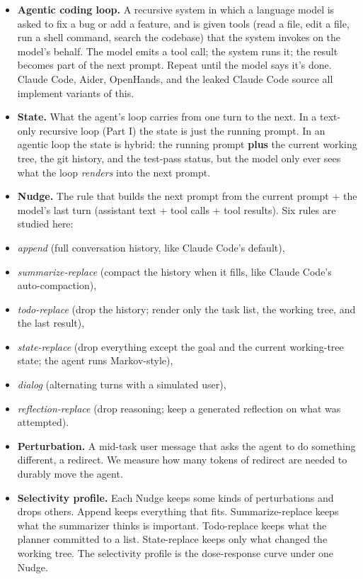 \documentclass{article}
\theoremstyle{plain}
\theoremstyle{definition}
\begin{document}
\begin{itemize}
  \item \textbf{Agentic coding loop.} A recursive system in which a language model is asked to fix a bug or add a feature, and is given tools (read a file, edit a file, run a shell command, search the codebase) that the system invokes on the model's behalf. The model emits a tool call; the system runs it; the result becomes part of the next prompt. Repeat until the model says it's done. Claude Code, Aider, OpenHands, and the leaked Claude Code source all implement variants of this.
  \item \textbf{State.} What the agent's loop carries from one turn to the next. In a text-only recursive loop (Part I) the state is just the running prompt. In an agentic loop the state is hybrid: the running prompt \textbf{plus} the current working tree, the git history, and the test-pass status, but the model only ever sees what the loop \textit{renders} into the next prompt.
  \item \textbf{Nudge.} The rule that builds the next prompt from the current prompt + the model's last turn (assistant text + tool calls + tool results). Six rules are studied here:
  \item \textit{append} (full conversation history, like Claude Code's default),
  \item \textit{summarize-replace} (compact the history when it fills, like Claude Code's auto-compaction),
  \item \textit{todo-replace} (drop the history; render only the task list, the working tree, and the last result),
  \item \textit{state-replace} (drop everything except the goal and the current working-tree state; the agent runs Markov-style),
  \item \textit{dialog} (alternating turns with a simulated user),
  \item \textit{reflection-replace} (drop reasoning; keep a generated reflection on what was attempted).
  \item \textbf{Perturbation.} A mid-task user message that asks the agent to do something different, a redirect. We measure how many tokens of redirect are needed to durably move the agent.
  \item \textbf{Selectivity profile.} Each Nudge keeps some kinds of perturbations and drops others. Append keeps everything that fits. Summarize-replace keeps what the summarizer thinks is important. Todo-replace keeps what the planner committed to a list. State-replace keeps only what changed the working tree. The selectivity profile is the dose-response curve under one Nudge.
\end{itemize}
\end{document}

